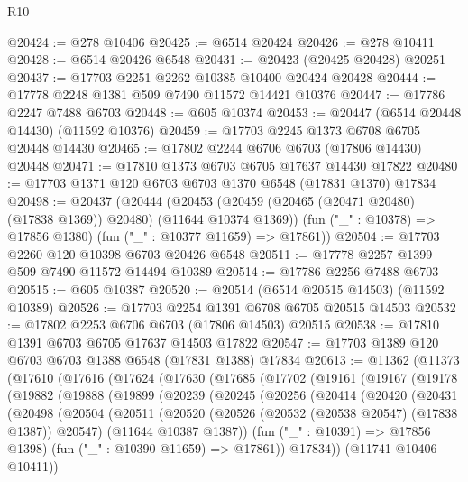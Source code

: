 \begin{lexlean}{R10}
\begin{coremodule}
@20424 := @278 @10406
@20425 := @6514 @20424
@20426 := @278 @10411
@20428 := @6514 @20426 @6548
@20431 := @20423 (@20425 @20428) @20251
@20437 := @17703 @2251 @2262 @10385 @10400 @20424 @20428
@20444 := @17778 @2248 @1381 @509 @7490 @11572 @14421 @10376
@20447 := @17786 @2247 @7488 @6703
@20448 := @605 @10374
@20453 := @20447 (@6514 @20448 @14430) (@11592 @10376)
@20459 := @17703 @2245 @1373 @6708 @6705 @20448 @14430
@20465 := @17802 @2244 @6706 @6703 (@17806 @14430) @20448
@20471 := @17810 @1373 @6703 @6705 @17637 @14430 @17822
@20480 := @17703 @1371 @120 @6703 @6703 @1370 @6548 (@17831 @1370) @17834
@20498 := @20437
    (@20444
      (@20453 (@20459 (@20465 (@20471 @20480) (@17838 @1369)) @20480) (@11644 @10374 @1369))
      (fun ("_" : @10378) => @17856 @1380)
      (fun ("_" : @10377 @11659) => @17861))
@20504 := @17703 @2260 @120 @10398 @6703 @20426 @6548
@20511 := @17778 @2257 @1399 @509 @7490 @11572 @14494 @10389
@20514 := @17786 @2256 @7488 @6703
@20515 := @605 @10387
@20520 := @20514 (@6514 @20515 @14503) (@11592 @10389)
@20526 := @17703 @2254 @1391 @6708 @6705 @20515 @14503
@20532 := @17802 @2253 @6706 @6703 (@17806 @14503) @20515
@20538 := @17810 @1391 @6703 @6705 @17637 @14503 @17822
@20547 := @17703 @1389 @120 @6703 @6703 @1388 @6548 (@17831 @1388) @17834
@20613 := @11362
    (@11373
      (@17610
        (@17616
          (@17624
            (@17630
              (@17685
                (@17702
                  (@19161
                    (@19167
                      (@19178
                        (@19882
                          (@19888
                            (@19899
                              (@20239
                                (@20245
                                  (@20256
                                    (@20414
                                      (@20420
                                        (@20431
                                          (@20498
                                            (@20504
                                              (@20511
                                                (@20520
                                                  (@20526
                                                    (@20532 (@20538 @20547) (@17838 @1387))
                                                    @20547)
                                                  (@11644 @10387 @1387))
                                                (fun ("_" : @10391) => @17856 @1398)
                                                (fun ("_" : @10390 @11659) => @17861))
                                              @17834))
                                          (@11741 @10406 @10411))

\end{coremodule}
\end{lexlean}
